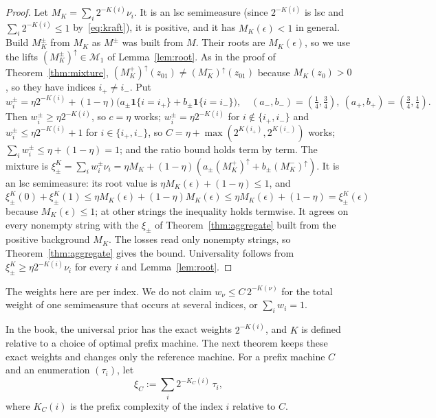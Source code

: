 \documentclass[11pt]{article}
\newcommand{\eps}{\epsilon}
\newcommand{\cMone}{\mathcal{M}_1}
\newcommand{\ind}{\mathbf{1}}
\theoremstyle{definition}
\theoremstyle{remark}
\begin{document}
\begin{proof}
Let $M_K=\sum_i2^{-K(i)}\nu_i$. It is an lsc semimeasure (since $2^{-K(i)}$
is lsc and $\sum_i2^{-K(i)}\le1$ by~\eqref{eq:kraft}), it is positive, and it
has $M_K(\eps)<1$ in general. Build $M_K^\pm$ from $M_K$ as $M^\pm$ was built from $M$. Their roots are
$M_K(\eps)$, so we use the lifts $(M_K^\pm)^\uparrow\in\cMone$ of
Lemma~\ref{lem:root}. As in the proof of Theorem~\ref{thm:mixture},
$(M_K^+)^\uparrow(z_01)\neq(M_K^-)^\uparrow(z_01)$ because $M_K(z_0)>0$, so they have
indices $i_+\neq i_-$. Put
\[
w^\pm_i=\eta2^{-K(i)}+(1-\eta)\bigl(a_\pm\ind\{i=i_+\}+b_\pm\ind\{i=i_-\}\bigr),
\quad (a_-,b_-)=(\tfrac14,\tfrac34),\ (a_+,b_+)=(\tfrac34,\tfrac14).
\]
Then $w^\pm_i\ge\eta2^{-K(i)}$, so $c=\eta$ works; $w^\pm_i=\eta2^{-K(i)}$ for
$i\notin\{i_+,i_-\}$ and $w^\pm_i\le\eta2^{-K(i)}+1$ for $i\in\{i_+,i_-\}$, so
$C=\eta+\max(2^{K(i_+)},2^{K(i_-)})$ works; $\sum_iw^\pm_i\le\eta+(1-\eta)=1$; and the
ratio bound holds term by term. The mixture is
$\xi^K_\pm=\sum_iw^\pm_i\nu_i=\eta M_K+(1-\eta)(a_\pm(M_K^+)^\uparrow+b_\pm(M_K^-)^\uparrow)$. It is
an lsc semimeasure: its root value is $\eta M_K(\eps)+(1-\eta)\le1$, and
$\xi^K_\pm(0)+\xi^K_\pm(1)\le\eta M_K(\eps)+(1-\eta)M_K(\eps)\le\eta M_K(\eps)+(1-\eta)=\xi^K_\pm(\eps)$
because $M_K(\eps)\le1$; at other strings the inequality holds termwise. It
agrees on every nonempty string with the $\xi_\pm$ of
Theorem~\ref{thm:aggregate} built from the positive background $M_K$. The
losses read only nonempty strings, so Theorem~\ref{thm:aggregate} gives the
bound. Universality follows from $\xi^K_\pm\ge\eta2^{-K(i)}\nu_i$ for every $i$
and Lemma~\ref{lem:root}.
\end{proof}

The weights here are per index. We do not claim
$w_\nu\le C\,2^{-K(\nu)}$ for the total weight of one semimeasure that occurs
at several indices, or $\sum_iw_i=1$.

In the book, the universal prior has the exact weights $2^{-K(i)}$, and $K$
is defined relative to a choice of optimal prefix machine. The next theorem
keeps these exact weights and changes only the reference machine. For a prefix
machine $C$ and an enumeration $(\tau_i)$, let
\[
\xi_C:=\sum_i2^{-K_C(i)}\,\tau_i ,
\]
where $K_C(i)$ is the prefix complexity of the index $i$ relative to $C$.
\end{document}
